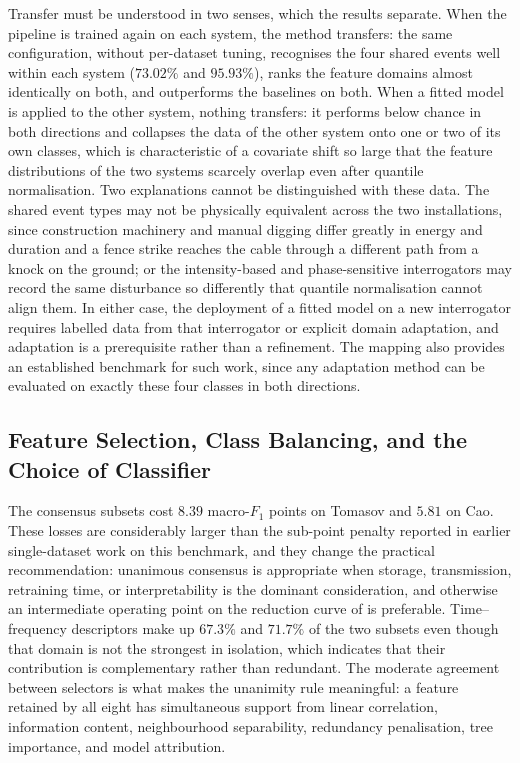 Transfer must be understood in two senses, which the results separate. When the pipeline is trained again on each system, the method transfers: the same configuration, without per-dataset tuning, recognises the four shared events well within each system ($73.02\%$ and $95.93\%$), ranks the feature domains almost identically on both, and outperforms the baselines on both. When a fitted model is applied to the other system, nothing transfers: it performs below chance in both directions and collapses the data of the other system onto one or two of its own classes, which is characteristic of a covariate shift so large that the feature distributions of the two systems scarcely overlap even after quantile normalisation. Two explanations cannot be distinguished with these data. The shared event types may not be physically equivalent across the two installations, since construction machinery and manual digging differ greatly in energy and duration and a fence strike reaches the cable through a different path from a knock on the ground; or the intensity-based and phase-sensitive interrogators may record the same disturbance so differently that quantile normalisation cannot align them. In either case, the deployment of a fitted model on a new interrogator requires labelled data from that interrogator or explicit domain adaptation, and adaptation is a prerequisite rather than a refinement. The mapping also provides an established benchmark for such work, since any adaptation method can be evaluated on exactly these four classes in both directions.

\subsection{Feature Selection, Class Balancing, and the Choice of Classifier}
\label{sec:resDiscComponents}
The consensus subsets cost $8.39$ macro-$F_1$ points on Tomasov and $5.81$ on Cao. These losses are considerably larger than the sub-point penalty reported in earlier single-dataset work on this benchmark, and they change the practical recommendation: unanimous consensus is appropriate when storage, transmission, retraining time, or interpretability is the dominant consideration, and otherwise an intermediate operating point on the reduction curve of  is preferable. Time--frequency descriptors make up $67.3\%$ and $71.7\%$ of the two subsets even though that domain is not the strongest in isolation, which indicates that their contribution is complementary rather than redundant. The moderate agreement between selectors is what makes the unanimity rule meaningful: a feature retained by all eight has simultaneous support from linear correlation, information content, neighbourhood separability, redundancy penalisation, tree importance, and model attribution.

